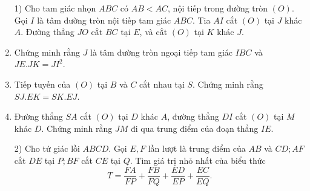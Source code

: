 \begin{ex}%
   \begin{enumerate}
   \item[1)]
   Cho tam giác nhọn $ABC$ có $AB<AC$, nội tiếp trong đường tròn $(O)$. Gọi $I$ là tâm đường tròn nội tiếp tam giác $ABC$. Tia $AI$ cắt $(O)$ tại $J$ khác $A$. Đường thẳng $JO$ cắt $BC$ tại $E$, và cắt $(O)$ tại $K$ khác $J$.
    
        \item Chứng minh rằng $J$ là tâm đường tròn ngoại tiếp tam giác $IBC$ và $JE.JK=JI^2$.
        \item Tiếp tuyến của $(O)$ tại $B$ và $C$ cắt nhau tại $S$. Chứng minh rằng $SJ.EK=SK.EJ$.
        \item Đường thẳng $SA$ cắt $(O)$ tại $D$ khác $A$, đường thẳng $DI$ cắt $(O)$ tại $M$ khác $D$. Chứng minh rằng $JM$ đi qua trung điểm của đoạn thẳng $IE$.
        \item[2)] Cho tứ giác lồi $ABCD$. Gọi $E,F$ lần lượt là trung điểm của $AB$ và $CD; AF$ cắt $DE$ tại $P; BF$ cắt $CE$ tại $Q$. Tìm giá trị nhỏ nhất của biểu thức
$$T=\dfrac{FA}{FP}+\dfrac{FB}{FQ}+\dfrac{ED}{EP}+\dfrac{EC}{EQ}.$$
    \end{enumerate} 
\loigiai{
\begin{enumerate}


\end{enumerate}}
\end{ex}
